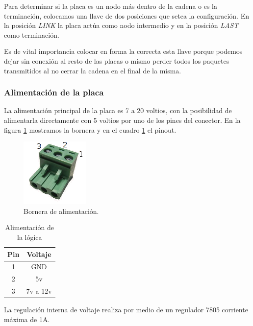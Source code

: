Para determinar si la placa es un nodo m\'as dentro de la cadena o es la terminaci\'on, colocamos una llave de dos posiciones
que setea la configuraci\'on.
En la posici\'on \emph{LINK} la placa act\'ua como nodo intermedio y en la posici\'on \emph{LAST} como terminaci\'on.

Es de vital importancia colocar en forma la correcta esta llave porque podemos dejar sin conexi\'on al resto de las placas o mismo
perder todos los paquetes transmitidos al no cerrar la cadena en el final de la misma.

\subsubsection{Alimentaci\'on de la placa}
\label{h_placas_generica_alimentacion}

La alimentaci\'on principal de la placa es 7 a 20 voltios, con la posibilidad de alimentarla directamente con 5 voltios
por uno de los pines del conector.
En la figura \ref{hF_placa_gen_borneras} mostramos la bornera y en el cuadro \ref{hT_placa_gen_alimentacion} el pinout.

\begin{figure}[ht]
	\centering
	\includegraphics[scale=.3]{bornera3.png}
	\caption{Bornera de alimentaci\'on.}
	\label{hF_placa_gen_borneras}
\end{figure}

\begin{table}
	\begin{center}
		\begin{tabular}{|c|c|}
			\hline
			Pin & Voltaje \\
			\hline
			1 & GND \\
			\hline
			2 & 5v \\
			\hline
			3 & 7v a 12v \\
			\hline
		\end{tabular}
		\caption{Alimentaci\'on de la l\'ogica}
		\label{hT_placa_gen_alimentacion}
	\end{center}
\end{table}

La regulaci\'on interna de voltaje realiza por medio de un regulador 7805 corriente m\'axima de 1A.

